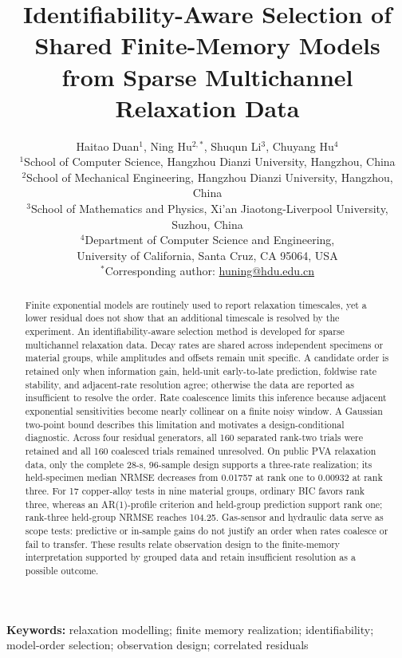 \documentclass[11pt]{article}
\title{Identifiability-Aware Selection of Shared Finite-Memory Models\\from Sparse Multichannel Relaxation Data}
\author{Haitao Duan$^{1}$, Ning Hu$^{2,*}$, Shuqun Li$^{3}$, Chuyang Hu$^{4}$\\[2mm]
\small $^1$School of Computer Science, Hangzhou Dianzi University, Hangzhou, China\\
\small $^2$School of Mechanical Engineering, Hangzhou Dianzi University, Hangzhou, China\\
\small $^3$School of Mathematics and Physics, Xi'an Jiaotong-Liverpool University, Suzhou, China\\
\small $^4$Department of Computer Science and Engineering,\\
\small University of California, Santa Cruz, CA 95064, USA\\[1mm]
\small $^*$Corresponding author: \href{mailto:huning@hdu.edu.cn}{huning@hdu.edu.cn}}
\date{}
\begin{document}
\maketitle

\begin{abstract}
Finite exponential models are routinely used to report relaxation timescales, yet a lower residual does not show that an additional timescale is resolved by the experiment. An identifiability-aware selection method is developed for sparse multichannel relaxation data. Decay rates are shared across independent specimens or material groups, while amplitudes and offsets remain unit specific. A candidate order is retained only when information gain, held-unit early-to-late prediction, foldwise rate stability, and adjacent-rate resolution agree; otherwise the data are reported as insufficient to resolve the order. Rate coalescence limits this inference because adjacent exponential sensitivities become nearly collinear on a finite noisy window. A Gaussian two-point bound describes this limitation and motivates a design-conditional diagnostic. Across four residual generators, all 160 separated rank-two trials were retained and all 160 coalesced trials remained unresolved. On public PVA relaxation data, only the complete 28-s, 96-sample design supports a three-rate realization; its held-specimen median NRMSE decreases from 0.01757 at rank one to 0.00932 at rank three. For 17 copper-alloy tests in nine material groups, ordinary BIC favors rank three, whereas an AR(1)-profile criterion and held-group prediction support rank one; rank-three held-group NRMSE reaches 104.25. Gas-sensor and hydraulic data serve as scope tests: predictive or in-sample gains do not justify an order when rates coalesce or fail to transfer. These results relate observation design to the finite-memory interpretation supported by grouped data and retain insufficient resolution as a possible outcome.
\end{abstract}

\noindent\textbf{Keywords:} relaxation modelling; finite memory realization; identifiability; model-order selection; observation design; correlated residuals
\end{document}
